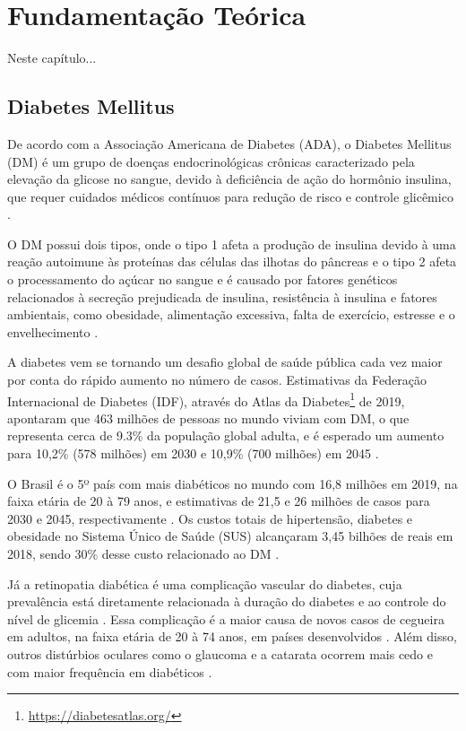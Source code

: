 \chapter{Fundamentação Teórica}

Neste capítulo...

\section{Diabetes Mellitus}

De acordo com a Associação Americana de Diabetes (ADA), o Diabetes Mellitus (DM) é um grupo de doenças endocrinológicas crônicas
caracterizado pela elevação da glicose no sangue, devido à deficiência de ação do hormônio insulina, que requer cuidados médicos
contínuos para redução de risco e controle glicêmico \cite{ADA2019}.

O DM possui dois tipos, onde o tipo 1 afeta a produção de insulina devido à uma reação autoimune às proteínas das células das
ilhotas do pâncreas e o tipo 2 afeta o processamento do açúcar no sangue e é causado por fatores genéticos relacionados à
secreção prejudicada de insulina, resistência à insulina e fatores ambientais, como obesidade, alimentação excessiva, falta de
exercício, estresse e o envelhecimento \cite{Ozougwu_2013}.

A diabetes vem se tornando um desafio global de saúde pública cada vez maior por conta do rápido aumento no número de casos.
Estimativas da Federação Internacional de Diabetes (IDF), através do Atlas da Diabetes\footnote{\url{https://diabetesatlas.org/}}
de 2019, apontaram que 463 milhões de pessoas no mundo viviam com DM, o que representa cerca de 9.3\% da população
global adulta, e é esperado um aumento para 10,2\% (578 milhões) em 2030 e 10,9\% (700 milhões) em 2045 \cite{SAEEDI2019107843}.

O Brasil é o 5º país com mais diabéticos no mundo com 16,8 milhões em 2019, na faixa etária de 20 à 79 anos, e estimativas
de 21,5 e 26 milhões de casos para 2030 e 2045, respectivamente \cite{SAEEDI2019107843}. Os custos totais de hipertensão, diabetes
e obesidade no Sistema Único de Saúde (SUS) alcançaram 3,45 bilhões de reais em 2018, sendo 30\% desse custo relacionado ao DM \cite{Nilson2020}.

Já a retinopatia diabética é uma complicação vascular do diabetes, cuja prevalência está diretamente relacionada à duração
do diabetes e ao controle do nível de glicemia \cite{Solomon412}. Essa complicação é a maior causa de novos casos de cegueira
em adultos, na faixa etária de 20 à 74 anos, em países desenvolvidos \cite{ADA2019}. Além disso, outros distúrbios oculares
como o glaucoma e a catarata ocorrem mais cedo e com maior frequência em diabéticos \cite{ADA2019}.

